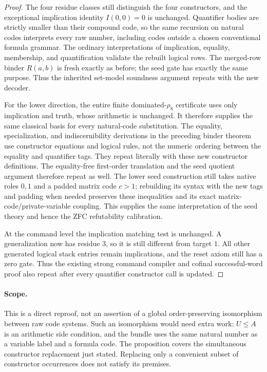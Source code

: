\begin{proof}
The four residue classes still distinguish the four constructors, and
the exceptional implication identity $I(0,0)=0$ is unchanged.
Quantifier bodies are strictly smaller than their compound code, so
the same recursion on natural codes interprets every raw number,
including codes outside a chosen conventional formula grammar.
The ordinary interpretations of implication, equality, membership,
and quantification validate the rebuilt logical rows. The merged-row
binder $R(a,b)$ is fresh exactly as before; the seed gate has exactly
the same purpose. Thus the inherited set-model soundness argument
repeats with the new decoder.

For the lower direction, the entire finite dominated-$\rho_8$
certificate uses only implication and truth, whose arithmetic is
unchanged. It therefore supplies the same classical basis for every
natural-code substitution. The equality, specialization, and
indiscernibility derivations in the preceding binder theorem use
constructor equations and logical rules, not the numeric ordering
between the equality and quantifier tags. They repeat literally with
these new constructor definitions. The equality-free first-order
translation and the seed quotient argument therefore repeat as well.
The lower seed construction still takes native roles $0,1$ and a
padded matrix code $c>1$; rebuilding its syntax with the new tags and
padding when needed preserves these inequalities and its exact
matrix-code/private-variable coupling. This supplies the same
interpretation of the seed theory and hence the ZFC refutability
calibration.

At the command level the implication matching test is unchanged.
A generalization now has residue $3$, so it is still different from
target $1$. All other generated logical stack entries remain
implications, and the reset axiom still has a zero gate. Thus the
existing strong command compiler and cofinal successful-word proof
also repeat after every quantifier constructor call is updated.
\end{proof}

\paragraph{Scope.}
This is a direct reproof, not an assertion of a global order-preserving
isomorphism between raw code systems. Such an isomorphism would need
extra work: $U\leq A$ is an arithmetic side condition, and the bundle
uses the same natural number as a variable label and a formula code.
The proposition covers the simultaneous constructor replacement just
stated. Replacing only a convenient subset of constructor occurrences
does not satisfy its premises.

